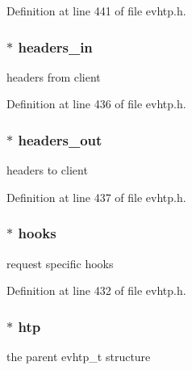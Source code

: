 Definition at line 441 of file evhtp.\-h.

\hypertarget{structevhtp__request__s_a231fb5c9d95add6d73b4500233a98de8}{
\subsubsection[{headers\-\_\-in}]{$\ast$ headers\-\_\-in}}\label{structevhtp__request__s_a231fb5c9d95add6d73b4500233a98de8}
headers from client 

Definition at line 436 of file evhtp.\-h.

\hypertarget{structevhtp__request__s_a139e220680f914ac7a44f3dac1b34be0}{
\subsubsection[{headers\-\_\-out}]{$\ast$ headers\-\_\-out}}\label{structevhtp__request__s_a139e220680f914ac7a44f3dac1b34be0}
headers to client 

Definition at line 437 of file evhtp.\-h.

\hypertarget{structevhtp__request__s_ac97663394f74c9030e57c771cfb7981e}{
\subsubsection[{hooks}]{$\ast$ hooks}}\label{structevhtp__request__s_ac97663394f74c9030e57c771cfb7981e}
request specific hooks 

Definition at line 432 of file evhtp.\-h.

\hypertarget{structevhtp__request__s_ad2f5cc5c9e97f75f1fe923c57af9e875}{
\subsubsection[{htp}]{$\ast$ htp}}\label{structevhtp__request__s_ad2f5cc5c9e97f75f1fe923c57af9e875}
the parent evhtp\-\_\-t structure 

